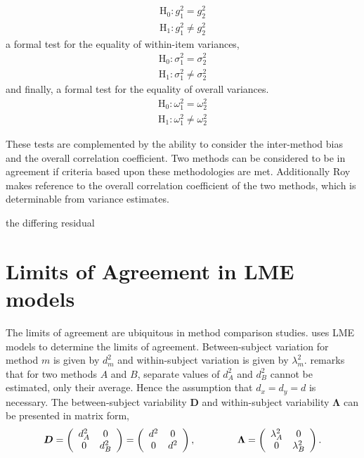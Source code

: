 \documentclass[12pt, a4paper]{article}
\theoremstyle{plain}
\theoremstyle{definition}
\theoremstyle{remark}
\begin{document}
	
	\begin{eqnarray*}
		\operatorname{H_0} : g^2_1 = g^2_2 \\
		\operatorname{H_1} : g^2_1 \neq g^2_2
	\end{eqnarray*}
	a formal test for the equality of within-item variances,
	\begin{eqnarray*}
		\operatorname{H_0} : \sigma^2_1 = \sigma^2_2 \\
		\operatorname{H_1} : \sigma^2_1 \neq \sigma^2_2
	\end{eqnarray*}
	and finally, a formal test for the equality of overall variances.
	\begin{eqnarray*}
		\operatorname{H_0} : \omega^2_1 = \omega^2_2 \\
		\operatorname{H_1} : \omega^2_1 \neq \omega^2_2
	\end{eqnarray*}
	
	
	These tests are complemented by the ability to consider the inter-method bias and the overall correlation coefficient.
	Two methods can be considered to be in agreement if criteria based upon these methodologies are met. Additionally Roy makes reference to the overall correlation coefficient of the two methods, which is determinable from variance estimates.
	
\newpage
the differing residual %
\newpage

\section{Limits of Agreement in LME models}
	The limits of agreement \citep{BA86} are ubiquitous in method comparison studies. \citet{BXC2008} uses LME models to determine the limits of agreement. Between-subject variation for method $m$ is given by $d^2_{m}$ and within-subject variation is given by $\lambda^2_{m}$.  \citet{BXC2008} remarks that for two methods $A$ and $B$, separate values of $d^2_{A}$ and $d^2_{B}$ cannot be estimated, only their average. Hence the assumption that $d_{x}= d_{y}= d$ is necessary. The between-subject variability $\boldsymbol{D}$ and within-subject variability $\boldsymbol{\Lambda}$ can be presented in matrix form,\[
\boldsymbol{D} = \left(%
\begin{array}{cc}
d^2_{A}& 0 \\
0 & d^2_{B} \\
\end{array}%
\right)=\left(%
\begin{array}{cc}
d^2& 0 \\
0 & d^2\\
\end{array}%
\right),
\hspace{1.5cm}
\boldsymbol{\Lambda} = \left(%
\begin{array}{cc}
\lambda^2_{A}& 0 \\
0 & \lambda^2_{B} \\
\end{array}%
\right).
\]
\end{document}
